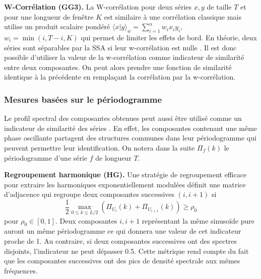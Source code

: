 \documentclass{gretsi}
\begin{document}
\textbf{W-Corrélation (GG3).}\label{par:GG3} 
    La W-corrélation pour deux séries $x, y$ de taille $T$ et pour une longueur de fenêtre $K$ est similaire à une corrélation classique mais utilise un produit scalaire pondéré $\langle x|y\rangle_w = \sum_{i=1}^n w_i x_i y_i$, $w_i = \min(i, T-i, K)$ qui permet de limiter les effets de bord.
    En théorie, deux séries sont séparables par la SSA si leur w-corrélation est nulle \cite{Golyandina_10_ssa}.
    Il est donc possible d'utiliser la valeur de la w-corrélation comme indicateur de similarité entre deux composantes.
    On peut alors prendre une fonction de similarité identique à la précédente en remplaçant la corrélation par la w-corrélation.
\subsubsection{Mesures basées sur le périodogramme}\label{ssub:per}
Le profil spectral des composantes obtenues peut aussi être utilisé comme un indicateur de similarité des séries \cite{Golyandina_10_ssa}.
En effet, les composantes contenant une même phase oscillante partagent des structures communes dans leur périodogramme qui peuvent permettre leur identification.
On notera dans la suite $\Pi_f(k)$ le périodogramme d'une série $f$ de longueur $T$.


\textbf{Regroupement harmonique (HG).}\label{par:HG}
    Une stratégie de regroupement efficace pour extraire les harmoniques exponentiellement modulées \cite{alexandrov_05_auto} définit une matrice d'adjacence qui regroupe deux composantes successives $(i, i+1)$ si 
    \begin{equation}
        \frac{1}{2}\max_{0\le k \le L/2}\left(\Pi_{U_i}(k) + \Pi_{U_{i+1}}(k)\right) \ge \rho_0 
    \end{equation}
    pour $\rho_0\in \left[0, 1\right]$.
    Deux composantes $i, i+1$ représentant la même sinusoïde pure auront un même périodogramme ce qui donnera une valeur de cet indicateur proche de 1.
    Au contraire, si deux composantes successives ont des spectres disjoints, l'indicateur ne peut dépasser 0.5.
    Cette métrique rend compte du fait que les composantes successives ont des pics de densité spectrale aux mêmes fréquences.
\end{document}
